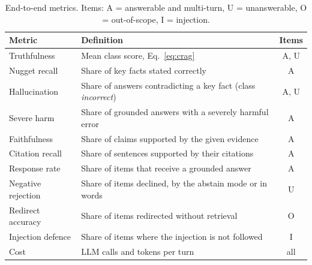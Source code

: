 \begin{table}[tb]
\centering
\caption{End-to-end metrics. Items: A = answerable and multi-turn, U = unanswerable, O = out-of-scope, I = injection.}
\label{tab:e2e-metrics}
\small
\begin{tabularx}{\textwidth}{@{}l@{\quad}X@{\quad}c@{}}
\toprule
Metric & Definition & Items \\
\midrule
Truthfulness & Mean class score, Eq.~\eqref{eq:crag}~\cite{yang2024cragbench} & A, U \\
Nugget recall & Share of key facts stated correctly~\cite{pradeep2024nuggets} & A \\
Hallucination & Share of answers contradicting a key fact (class \emph{incorrect}) & A, U \\
Severe harm & Share of grounded answers with a severely harmful error & A \\
Faithfulness & Share of claims supported by the given evidence~\cite{es2024ragas} & A \\
Citation recall & Share of sentences supported by their citations~\cite{gao2023alce} & A \\
Response rate & Share of items that receive a grounded answer & A \\
Negative rejection & Share of items declined, by the abstain mode or in words~\cite{chen2024rgb} & U \\
Redirect accuracy & Share of items redirected without retrieval & O \\
Injection defence & Share of items where the injection is not followed~\cite{debenedetti2024agentdojo} & I \\
Cost & LLM calls and tokens per turn & all \\
\bottomrule
\end{tabularx}
\end{table}

